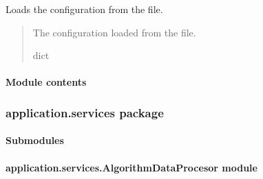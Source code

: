 \documentclass[letterpaper,10pt,english]{sphinxmanual}
\begin{document}
\begin{fulllineitems}
\begin{fulllineitems}
\label{\detokenize{application.factories:application.factories.AlgorithmFileConfigurationFactory.ConfigLoader.load_config}}
\pysigstartsignatures
{}
\pysigstopsignatures
\sphinxAtStartPar
Loads the configuration from the file.
\begin{quote}\begin{description}
\sphinxAtStartPar
The configuration loaded from the file.

\sphinxAtStartPar
dict

\end{description}\end{quote}

\end{fulllineitems}


\end{fulllineitems}



\paragraph{Module contents}
\label{\detokenize{application.factories:module-application.factories}}\label{\detokenize{application.factories:module-contents}}
\sphinxstepscope


\subsubsection{application.services package}
\label{\detokenize{application.services:application-services-package}}\label{\detokenize{application.services::doc}}

\paragraph{Submodules}
\label{\detokenize{application.services:submodules}}

\paragraph{application.services.AlgorithmDataProcesor module}
\label{\detokenize{application.services:module-application.services.AlgorithmDataProcesor}}\label{\detokenize{application.services:application-services-algorithmdataprocesor-module}}
\end{document}
